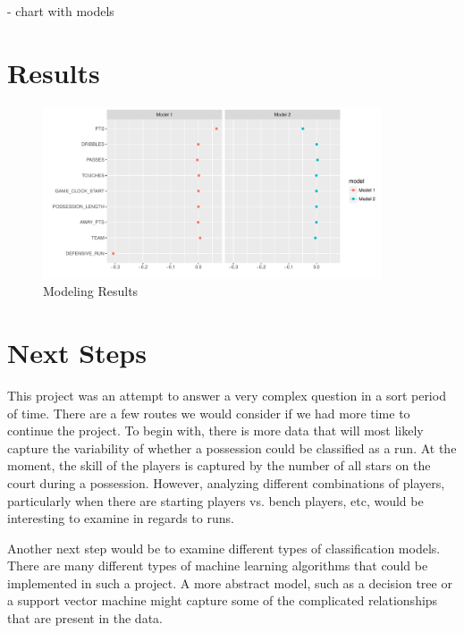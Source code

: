 \documentclass{article}
\begin{document}
- chart with models

\section{Results}

\begin{figure}[h]
\begin{center}
\includegraphics[width=100mm]{results.pdf}
\caption{Modeling Results}
\end{center}
\end{figure}

\section{Next Steps}

This project was an attempt to answer a very complex question in a sort period of time. There are a few routes we would consider if we had more time to continue the project. To begin with, there is more data that will most likely capture the variability of whether a possession could be classified as a run. At the moment, the skill of the players is captured by the number of all stars on the court during a possession. However, analyzing different combinations of players, particularly when there are starting players vs. bench players, etc, would be interesting to examine in regards to runs. \newline

Another next step would be to examine different types of classification models. There are many different types of machine learning algorithms that could be implemented in such a project. A more abstract model, such as a decision tree or a support vector machine might capture some of the complicated relationships that are present in the data. 
 
\end{document}
